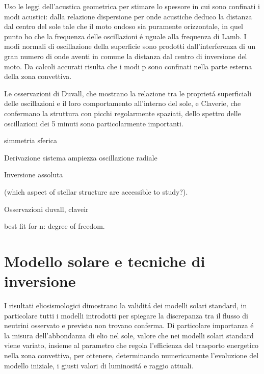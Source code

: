 Uso le leggi dell'acustica geometrica per stimare lo spessore in cui sono confinati i modi acustici: dalla relazione dispersione per onde acustiche deduco la distanza dal centro del sole tale che il moto ondoso sia puramente orizzontale, in quel punto ho che la frequenza delle oscillazioni \'e uguale alla frequenza di Lamb. I modi normali di oscillazione della superficie sono prodotti dall'interferenza di un gran numero di onde aventi in comune la distanza dal centro di inversione del moto. Da calcoli accurati risulta che i modi p sono confinati nella parte esterna della zona convettiva. 

Le osservazioni di Duvall, che mostrano la relazione tra le propriet\'a superficiali delle oscillazioni e il loro comportamento all'interno del sole, e Claverie, che confermano la struttura con picchi regolarmente spaziati, dello spettro delle oscillazioni dei 5 minuti sono particolarmente importanti.


\begin{itemize*}
\item simmetria sferica
\item Derivazione sistema ampiezza oscillazione radiale

\item Inversione assoluta
\item (which aspect of stellar structure are accessible to study?).
\item Osservazioni duvall, claveir \cite{duv82dispersion}
\item best fit for n: degree of freedom.
\end{itemize*}

\printbibliography[heading=subbibintoc]

\section{Modello solare e tecniche di inversione}


I risultati eliosismologici dimostrano la validit\'a dei modelli solari standard, in particolare tutti i modelli introdotti per spiegare la discrepanza tra il flusso di neutrini osservato e previsto non trovano conferma. Di particolare importanza \'e la  misura  dell'abbondanza di elio nel sole, valore che nei modelli solari standard viene variato, insieme al parametro che regola l'efficienza del trasporto energetico nella zona convettiva, per ottenere, determinando numericamente l'evoluzione del modello iniziale, i giusti valori di luminosit\'a e raggio attuali.

